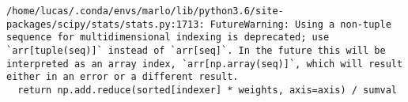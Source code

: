 \documentclass[11pt]{article}
\begin{document}
    \begin{Verbatim}[commandchars=\\\{\}]
/home/lucas/.conda/envs/marlo/lib/python3.6/site-packages/scipy/stats/stats.py:1713: FutureWarning: Using a non-tuple sequence for multidimensional indexing is deprecated; use `arr[tuple(seq)]` instead of `arr[seq]`. In the future this will be interpreted as an array index, `arr[np.array(seq)]`, which will result either in an error or a different result.
  return np.add.reduce(sorted[indexer] * weights, axis=axis) / sumval

    \end{Verbatim}

    \begin{center}
    \end{center}
    { \hspace*{\fill} \\}
    

    
    
    
    
\end{document}
